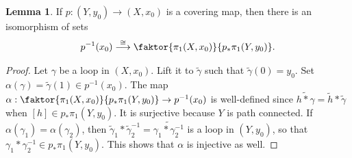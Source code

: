 \documentclass[10pt,letterpaper,cm]{nupset}
\theoremstyle{definition}
\theoremstyle{theorem}
\newtheorem{lemma}[definition]{Lemma}
\theoremstyle{remark}
\newcommand{\1}{\mathbb{1}}
\newcommand{\0}{\vec 0}
\begin{document}
\begin{lemma}
If $p: (Y, y_0) \to (X, x_0)$ is a covering map, then there is an isomorphism of sets $$p^{-1}(x_0) \overset{\cong}{\longrightarrow} \faktor{\pi_1(X, x_0)}{p_{\ast}\pi_1(Y, y_0)}.   $$
\end{lemma}
\begin{proof}
Let $\gamma$ be a loop in $(X, x_0)$. Lift it to $\tilde{\gamma}$ such that $\tilde{\gamma}(0) = y_0$. Set $\alpha(\gamma) = \tilde{\gamma}(1) \in p^{-1}(x_0)$. The map $\alpha : \faktor{\pi_1(X, x_0)}{p_{\ast}\pi_1(Y, y_0)} \to p^{-1}(x_0)$ is well-defined since $\widetilde{h \ast \gamma} = \tilde{h} \ast \tilde{\gamma}$ when $[h] \in p_{\ast}\pi_1(Y, y_0)$. It is surjective because $Y$ is path connected. If $\alpha(\gamma_1) = \alpha(\gamma_2)$, then $\tilde{\gamma}_1\ast \tilde{\gamma}_2^{-1}= \widetilde{\gamma_1 \ast \gamma_2^{-1}}$ is a loop in $(Y, y_0)$, so that $\gamma_1 \ast \gamma_2^{-1}  \in p_{\ast}\pi_1(Y, y_0)$. This shows that $\alpha$ is injective as well.
\end{proof}
\end{document}
